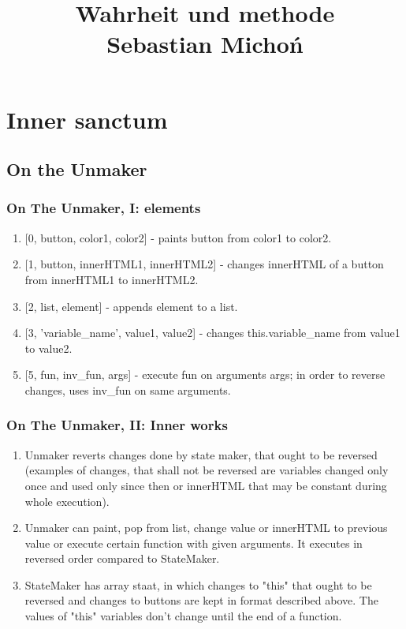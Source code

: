 \documentclass[12pt]{article}
\begin{document}
\title{Wahrheit und methode\\
\large Sebastian Michoń}
\date{\vspace{-10ex}}
\maketitle

\section {Inner sanctum}
\subsection {On the Unmaker}
\subsubsection{On The Unmaker, I: elements}
\begin {enumerate}
	\item {[0, button, color1, color2]} - paints button from color1 to color2.
	\item {[1, button, innerHTML1, innerHTML2]} - changes innerHTML of a button from innerHTML1 to innerHTML2.
	\item {[2, list, element]} - appends element to a list.
	\item {[3, 'variable\_name', value1, value2]} - changes this.variable\_name from value1 to value2.
	\item {[5, fun, inv\_fun, args]} - execute fun on arguments args; in order to reverse changes, uses inv\_fun on same arguments.
\end{enumerate}

\subsubsection{On The Unmaker, II: Inner works}
\begin {enumerate}
	\item Unmaker reverts changes done by state maker, that ought to be reversed (examples of changes, that shall not be reversed are variables changed only once and used only since then or innerHTML that may be constant during whole execution).
	\item Unmaker can paint, pop from list, change value or innerHTML to previous value or execute certain function with given arguments. It executes in reversed order compared to StateMaker.
	\item StateMaker has array staat, in which changes to "this" that ought to be reversed and changes to buttons are kept in format described above. The values of "this" variables don't change until the end of a function.
\end {enumerate}
\end{document}
